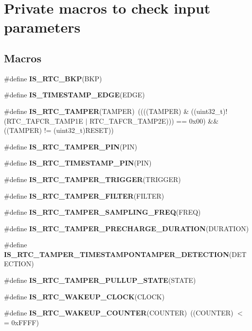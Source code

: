 \hypertarget{group___r_t_c_ex___i_s___r_t_c___definitions}{}\section{Private macros to check input parameters}
\label{group___r_t_c_ex___i_s___r_t_c___definitions}
\subsection*{Macros}
\begin{DoxyCompactItemize}
\item 
\#define {\bfseries I\+S\+\_\+\+R\+T\+C\+\_\+\+B\+KP}(B\+KP)
\item 
\#define {\bfseries I\+S\+\_\+\+T\+I\+M\+E\+S\+T\+A\+M\+P\+\_\+\+E\+D\+GE}(E\+D\+GE)
\item 
\#define {\bfseries I\+S\+\_\+\+R\+T\+C\+\_\+\+T\+A\+M\+P\+ER}(T\+A\+M\+P\+ER)~((((T\+A\+M\+P\+ER) \& ((uint32\+\_\+t)!(R\+T\+C\+\_\+\+T\+A\+F\+C\+R\+\_\+\+T\+A\+M\+P1E $\vert$ R\+T\+C\+\_\+\+T\+A\+F\+C\+R\+\_\+\+T\+A\+M\+P2E))) == 0x00) \&\& ((\+T\+A\+M\+P\+E\+R) != (uint32\+\_\+t)\+R\+E\+S\+E\+T))\hypertarget{group___r_t_c_ex___i_s___r_t_c___definitions_ga8cb706b03efeeb8534eca0a20450d377}{}\label{group___r_t_c_ex___i_s___r_t_c___definitions_ga8cb706b03efeeb8534eca0a20450d377}

\item 
\#define {\bfseries I\+S\+\_\+\+R\+T\+C\+\_\+\+T\+A\+M\+P\+E\+R\+\_\+\+P\+IN}(P\+IN)
\item 
\#define {\bfseries I\+S\+\_\+\+R\+T\+C\+\_\+\+T\+I\+M\+E\+S\+T\+A\+M\+P\+\_\+\+P\+IN}(P\+IN)
\item 
\#define {\bfseries I\+S\+\_\+\+R\+T\+C\+\_\+\+T\+A\+M\+P\+E\+R\+\_\+\+T\+R\+I\+G\+G\+ER}(T\+R\+I\+G\+G\+ER)
\item 
\#define {\bfseries I\+S\+\_\+\+R\+T\+C\+\_\+\+T\+A\+M\+P\+E\+R\+\_\+\+F\+I\+L\+T\+ER}(F\+I\+L\+T\+ER)
\item 
\#define {\bfseries I\+S\+\_\+\+R\+T\+C\+\_\+\+T\+A\+M\+P\+E\+R\+\_\+\+S\+A\+M\+P\+L\+I\+N\+G\+\_\+\+F\+R\+EQ}(F\+R\+EQ)
\item 
\#define {\bfseries I\+S\+\_\+\+R\+T\+C\+\_\+\+T\+A\+M\+P\+E\+R\+\_\+\+P\+R\+E\+C\+H\+A\+R\+G\+E\+\_\+\+D\+U\+R\+A\+T\+I\+ON}(D\+U\+R\+A\+T\+I\+ON)
\item 
\#define {\bfseries I\+S\+\_\+\+R\+T\+C\+\_\+\+T\+A\+M\+P\+E\+R\+\_\+\+T\+I\+M\+E\+S\+T\+A\+M\+P\+O\+N\+T\+A\+M\+P\+E\+R\+\_\+\+D\+E\+T\+E\+C\+T\+I\+ON}(D\+E\+T\+E\+C\+T\+I\+ON)
\item 
\#define {\bfseries I\+S\+\_\+\+R\+T\+C\+\_\+\+T\+A\+M\+P\+E\+R\+\_\+\+P\+U\+L\+L\+U\+P\+\_\+\+S\+T\+A\+TE}(S\+T\+A\+TE)
\item 
\#define {\bfseries I\+S\+\_\+\+R\+T\+C\+\_\+\+W\+A\+K\+E\+U\+P\+\_\+\+C\+L\+O\+CK}(C\+L\+O\+CK)
\item 
\#define {\bfseries I\+S\+\_\+\+R\+T\+C\+\_\+\+W\+A\+K\+E\+U\+P\+\_\+\+C\+O\+U\+N\+T\+ER}(C\+O\+U\+N\+T\+ER)~((C\+O\+U\+N\+T\+ER) $<$= 0x\+F\+F\+F\+F)\hypertarget{group___r_t_c_ex___i_s___r_t_c___definitions_ga6254b48843bdcb83b5b5cd640aeb6f9c}{}\label{group___r_t_c_ex___i_s___r_t_c___definitions_ga6254b48843bdcb83b5b5cd640aeb6f9c}


\end{DoxyCompactItemize}
